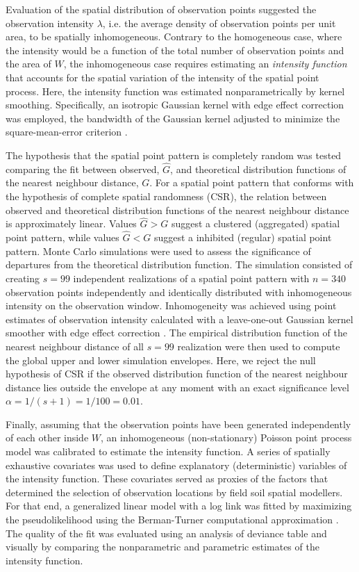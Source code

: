 Evaluation of the spatial distribution of observation points suggested the observation intensity $\lambda$, 
i.e. the average density of observation points per unit area, to be spatially inhomogeneous. Contrary to the 
homogeneous case, where the intensity would be a function of the total number of observation points and the 
area of $W$, the inhomogeneous case requires estimating an \emph{intensity function} that accounts for the 
spatial variation of the intensity of the spatial point process. Here, the intensity function was estimated 
nonparametrically by kernel smoothing. Specifically, an isotropic Gaussian kernel with edge effect correction 
was employed, the bandwidth of the Gaussian kernel adjusted to minimize the square-mean-error criterion 
\cite{Diggle1985}.

The hypothesis that the spatial point pattern is completely random was tested comparing the fit between 
observed, $\widehat{G}$, and theoretical distribution functions of the nearest neighbour distance, $G$. For a 
spatial point pattern that conforms with the hypothesis of complete spatial randomness (CSR), the relation 
between observed and theoretical distribution functions of the nearest neighbour distance is approximately 
linear. Values $\widehat{G} > G$ suggest a clustered (aggregated) spatial point pattern, while values 
$\widehat{G} < G$ suggest a inhibited (regular) spatial point pattern. Monte Carlo simulations were used to 
assess the significance of departures from the theoretical distribution function. The simulation consisted of 
creating $s = 99$ independent realizations of a spatial point pattern with $n = 340$ observation points 
independently and identically distributed with inhomogeneous intensity on the observation window. Inhomogeneity 
was achieved using point estimates of observation intensity calculated with a leave-one-out Gaussian kernel 
smoother with edge effect correction \cite{BaddeleyEtAl2000}. The empirical distribution function of the 
nearest neighbour distance of all $s = 99$ realization were then used to compute the global upper and lower 
simulation envelopes. Here, we reject the null hypothesis of CSR if the observed distribution function of the 
nearest neighbour distance lies outside the envelope at any moment with an exact significance level $\alpha = 1 
/ (s + 1) = 1 / 100 = 0.01$.

Finally, assuming that the observation points have been generated independently of each other inside $W$, an 
inhomogeneous (non-stationary) Poisson point process model was calibrated to estimate the intensity function.
A series of spatially exhaustive covariates was used to define explanatory (deterministic) variables of the 
intensity function. These covariates served as proxies of the factors that determined the selection of 
observation locations by field soil spatial modellers. For that end, a generalized linear model with a log 
link was fitted by maximizing the pseudolikelihood using the Berman-Turner computational approximation 
\cite{Baddeley2010}. The quality of the fit was evaluated using an analysis of deviance table and visually 
by comparing the nonparametric and parametric estimates of the intensity function.

